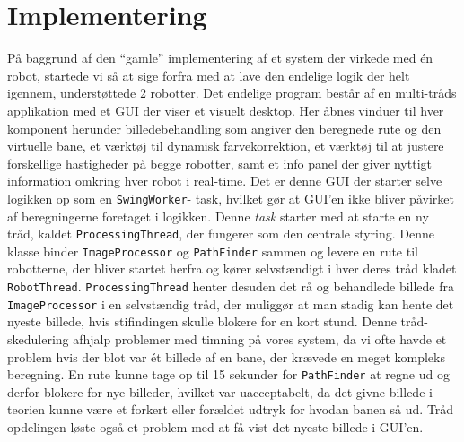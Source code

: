 \section{Implementering}
På baggrund af den "`gamle"' implementering af et system der virkede med én robot, startede vi så at sige forfra med at lave den endelige logik der helt igennem, understøttede 2 robotter.
Det endelige program består af en multi-tråds applikation med et GUI der viser et visuelt desktop. Her åbnes vinduer til hver komponent herunder billedebehandling som angiver den beregnede rute og den virtuelle bane, et værktøj til dynamisk farvekorrektion, et værktøj til at justere forskellige hastigheder på begge robotter, samt et info panel der giver nyttigt information omkring hver robot i real-time. Det er denne GUI der starter selve logikken op som en \texttt{SwingWorker}- task, hvilket gør at GUI’en ikke bliver påvirket af beregningerne foretaget i logikken. Denne \textit{task} starter med at starte en ny tråd, kaldet \texttt{ProcessingThread}, der fungerer som den centrale styring. Denne klasse binder \texttt{ImageProcessor} og \texttt{PathFinder} sammen og levere en rute til robotterne, der bliver startet herfra og kører selvstændigt i hver deres tråd kladet \texttt{RobotThread}. \texttt{ProcessingThread} henter desuden det rå og behandlede billede fra \texttt{ImageProcessor} i en selvstændig tråd, der muliggør at man stadig kan hente det nyeste billede, hvis stifindingen skulle blokere for en kort stund. Denne tråd-skedulering afhjalp problemer med timning på vores system, da vi ofte havde et problem hvis der blot var ét billede af en bane, der krævede en meget kompleks beregning. En rute kunne tage op til 15 sekunder for \texttt{PathFinder} at regne ud og derfor blokere for nye billeder, hvilket var uacceptabelt, da det givne billede i teorien kunne være et forkert eller forældet udtryk for hvodan banen så ud. Tråd opdelingen løste også et problem med at få vist det nyeste billede i GUI’en.

